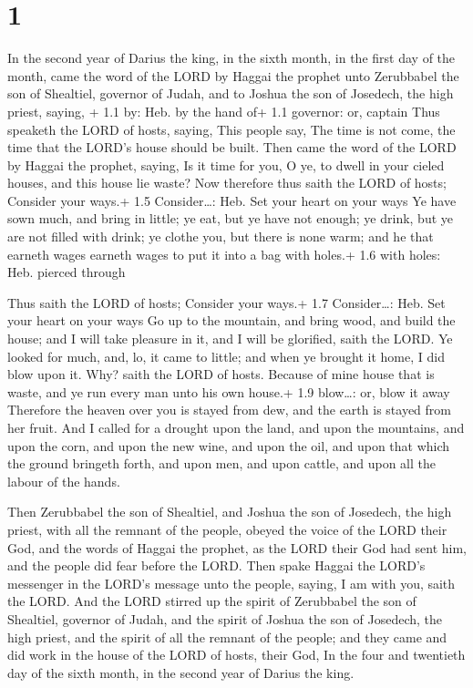 \hypertarget{section}{%
\section{1}\label{section}}

 In the second year of Darius the king, in the sixth month,
in the first day of the month, came the word of the LORD by Haggai the
prophet unto Zerubbabel the son of Shealtiel, governor of Judah, and to
Joshua the son of Josedech, the high priest, saying, + 1.1 by: Heb. by
the hand of+ 1.1 governor: or, captain  Thus speaketh the
LORD of hosts, saying, This people say, The time is not come, the time
that the LORD's house should be built.  Then came the word
of the LORD by Haggai the prophet, saying,  Is it time for
you, O ye, to dwell in your cieled houses, and this house lie waste?
 Now therefore thus saith the LORD of hosts; Consider your
ways.+ 1.5 Consider\ldots: Heb. Set your heart on your ways 
Ye have sown much, and bring in little; ye eat, but ye have not enough;
ye drink, but ye are not filled with drink; ye clothe you, but there is
none warm; and he that earneth wages earneth wages to put it into a bag
with holes.+ 1.6 with holes: Heb. pierced through

 Thus saith the LORD of hosts; Consider your ways.+ 1.7
Consider\ldots: Heb. Set your heart on your ways  Go up to
the mountain, and bring wood, and build the house; and I will take
pleasure in it, and I will be glorified, saith the LORD.  Ye
looked for much, and, lo, it came to little; and when ye brought it
home, I did blow upon it. Why? saith the LORD of hosts. Because of mine
house that is waste, and ye run every man unto his own house.+ 1.9
blow\ldots: or, blow it away  Therefore the heaven over you
is stayed from dew, and the earth is stayed from her fruit.
 And I called for a drought upon the land, and upon the
mountains, and upon the corn, and upon the new wine, and upon the oil,
and upon that which the ground bringeth forth, and upon men, and upon
cattle, and upon all the labour of the hands.

 Then Zerubbabel the son of Shealtiel, and Joshua the son
of Josedech, the high priest, with all the remnant of the people, obeyed
the voice of the LORD their God, and the words of Haggai the prophet, as
the LORD their God had sent him, and the people did fear before the
LORD.  Then spake Haggai the LORD's messenger in the LORD's
message unto the people, saying, I am with you, saith the LORD.
 And the LORD stirred up the spirit of Zerubbabel the son
of Shealtiel, governor of Judah, and the spirit of Joshua the son of
Josedech, the high priest, and the spirit of all the remnant of the
people; and they came and did work in the house of the LORD of hosts,
their God,  In the four and twentieth day of the sixth
month, in the second year of Darius the king.

